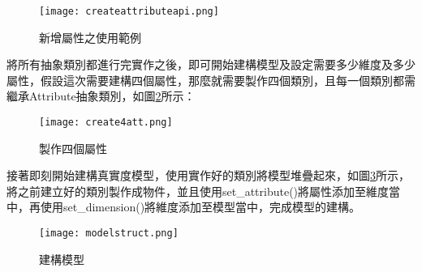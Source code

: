 \begin{figure}[H]
\centering
\graphicspath{{/Users/FUDA/Documents/masterThesis/image/}}
\texttt{[image: createattributeapi.png]}
\caption{新增屬性之使用範例}
\label{createattributeapi}
\end{figure}

將所有抽象類別都進行完實作之後，即可開始建構模型及設定需要多少維度及多少屬性，假設這次需要建構四個屬性，那麼就需要製作四個類別，且每一個類別都需繼承Attribute抽象類別，如圖\ref{create4att}所示：
\begin{figure}[H]
\centering
\graphicspath{{/Users/FUDA/Documents/masterThesis/image/}}
\texttt{[image: create4att.png]}
\caption{製作四個屬性}
\label{create4att}
\end{figure}

接著即刻開始建構真實度模型，使用實作好的類別將模型堆疊起來，如圖\ref{modelstruct}所示，將之前建立好的類別製作成物件，並且使用set\_attribute()將屬性添加至維度當中，再使用set\_dimension()將維度添加至模型當中，完成模型的建構。
\begin{figure}[H]
\centering
\graphicspath{{/Users/FUDA/Documents/masterThesis/image/}}
\texttt{[image: modelstruct.png]}
\caption{建構模型}
\label{modelstruct}
\end{figure}